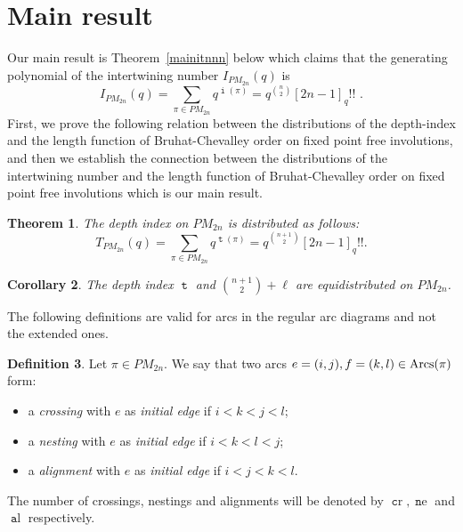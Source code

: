 \documentclass[11pt]{amsart}
\numberwithin{figure}{section}
\DeclareMathOperator{\arcs}{\text Arcs}
\DeclareMathOperator{\inumber}{\mathtt i}
\DeclareMathOperator{\dindex}{\mathtt t}
\DeclareMathOperator{\cro}{\mathtt cr}
\DeclareMathOperator{\nst}{\mathtt ne}
\DeclareMathOperator{\al}{\mathtt al}
\theoremstyle{plain}
\newtheorem{theorem}{Theorem}[section]
\newtheorem{corollary}[theorem]{Corollary}
\theoremstyle{definition}
\newtheorem{definition}[theorem]{Definition}
\begin{document}
\section{Main result}
Our main result is Theorem~\ref{mainitnnn} below which claims that the generating polynomial of the intertwining number $I_{PM_{2n}}(q)$ is
$$I_{PM_{2n} }(q) = \sum_{\pi\in PM_{2n} }q^{\inumber(\pi) }=q^{\binom{n}{2}}[2n-1]_q!!\,\,.
$$
First, we prove the following relation between the distributions of the depth-index and the length function of Bruhat-Chevalley order on fixed point free involutions, and then we establish the connection between the distributions of the intertwining number and the length function of Bruhat-Chevalley order on fixed point free involutions which is our main result.
\begin{theorem}\label{thm:main}
	The depth index on $PM_{2n}$ is distributed as follows:
	$$T_{PM_{2n}}(q)=\sum_{\pi\in PM_{2n} }q^{\dindex(\pi) }  =q^{\binom{n+1}{2} }[2n-1]_q!!.
	$$
\end{theorem}

\begin{corollary}
The depth index $\dindex$ and $\binom{n+1}{2}+\ell$ are equidistributed on $PM_{2n}$.
\end{corollary}

The following definitions are valid for arcs in the regular arc diagrams and not the extended ones.  
\begin{definition}\cite{CrossingNestingDistribution}
	Let $\pi\in PM_{2n}$. We say that two arcs $e=(i,j),f=(k,l)\in\arcs(\pi)$ form:
	\begin{itemize}
		\item[(i)] a {\em crossing} with $e$ as {\em initial edge} if $i < k < j < l$;
		\item[(ii)] a {\em nesting} with $e$ as {\em initial edge} if $i < k < l < j$;
		\item[(iii)] a {\em alignment} with $e$ as {\em initial edge} if $i < j < k < l$.
	\end{itemize}
The number of crossings, nestings and alignments will be denoted by $\cro,\nst$ and $\al$ respectively. 
\end{definition}
\end{document}
